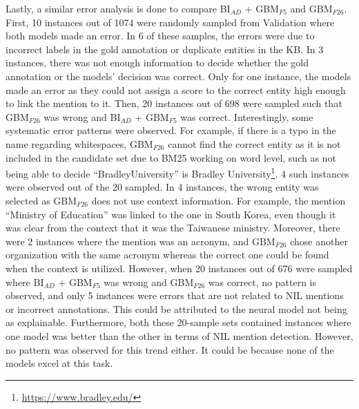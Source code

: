 \documentclass{report}
\theoremstyle{definition}
\theoremstyle{remark}
\begin{document}
Lastly, a similar error analysis is done to compare BI$_{AD}$ + GBM$_{F5}$ and GBM$_{F26}$. First, 10 instances out of 1074 were randomly sampled from Validation where both models made an error. In 6 of these samples, the errors were due to incorrect labels in the gold annotation or duplicate entities in the KB. In 3 instances, there was not enough information to decide whether the gold annotation or the models' decision was correct. Only for one instance, the models made an error as they could not assign a score to the correct entity high enough to link the mention to it. Then, 20 instances out of 698 were sampled such that GBM$_{F26}$ was wrong and BI$_{AD}$ + GBM$_{F5}$ was correct. Interestingly, some systematic error patterns were observed. For example, if there is a typo in the name regarding whitespaces, GBM$_{F26}$ cannot find the correct entity as it is not included in the candidate set due to BM25 working on word level, such as not being able to decide ``BradleyUniversity'' is Bradley University\footnote{\url{https://www.bradley.edu/}}. 4 such instances were observed out of the 20 sampled. In 4 instances, the wrong entity was selected as GBM$_{F26}$ does not use context information. For example, the mention ``Ministry of Education'' was linked to the one in South Korea, even though it was clear from the context that it was the Taiwanese ministry. Moreover, there were 2 instances where the mention was an acronym, and GBM$_{F26}$ chose another organization with the same acronym whereas the correct one could be found when the context is utilized. However, when 20 instances out of 676 were sampled where BI$_{AD}$ + GBM$_{F5}$ was wrong and GBM$_{F26}$ was correct, no pattern is observed, and only 5 instances were errors that are not related to NIL mentions or incorrect annotations. This could be attributed to the neural model not being as explainable. Furthermore, both these 20-sample sets contained instances where one model was better than the other in terms of NIL mention detection. However, no pattern was observed for this trend either. It could be because none of the models excel at this task.
\end{document}
